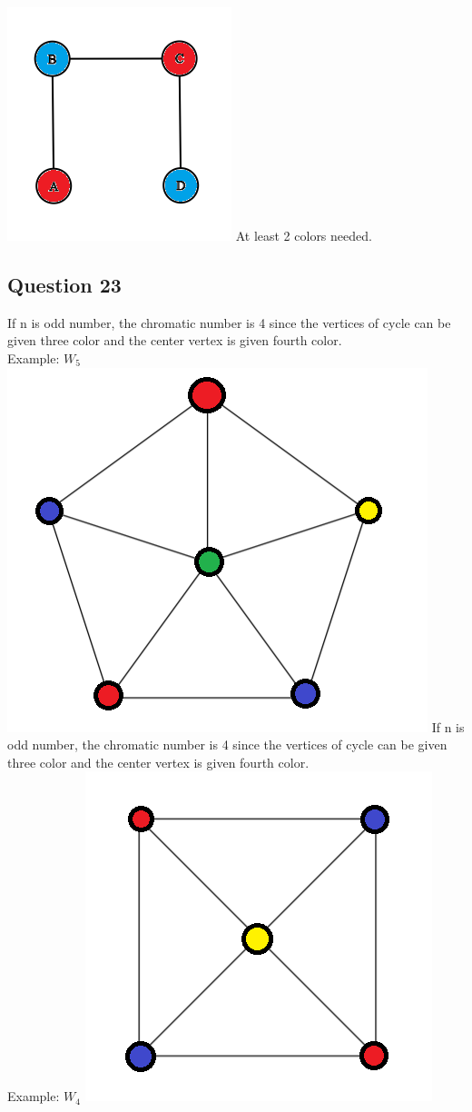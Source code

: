 \documentclass{article}
\begin{document}
\includegraphics[]{Question 22/connectivity_22.b.graph.png}
\newline
At least 2 colors needed.

\subsection*{Question 23}
If n is odd number, the chromatic number is 4 since the vertices of cycle can be given three color and the center vertex is given fourth color.\\
Example: $W_5$
\newline
\includegraphics[]{Question 23/connectivity_23.a.png}
\newline
If n is odd number, the chromatic number is 4 since the vertices of cycle can be given three color and the center vertex is given fourth color.\\
Example: $W_4$
\newline
\includegraphics[]{Question 23/connectivity_23.b.png}
\newline
\end{document}
